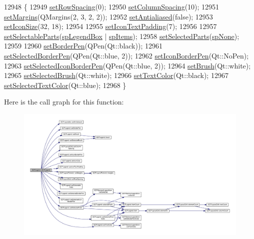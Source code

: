 \begin{DoxyCode}
12948 \{
12949   \hyperlink{class_q_c_p_layout_grid_aaef2cd2d456197ee06a208793678e436}{setRowSpacing}(0);
12950   \hyperlink{class_q_c_p_layout_grid_a3a49272aba32bb0fddc3bb2a45a3dba0}{setColumnSpacing}(10);
12951   \hyperlink{class_q_c_p_layout_element_a8f450b1f3f992ad576fce2c63d8b79cf}{setMargins}(QMargins(2, 3, 2, 2));
12952   \hyperlink{class_q_c_p_layerable_a4fd43e89be4a553ead41652565ff0581}{setAntialiased}(\textcolor{keyword}{false});
12953   \hyperlink{class_q_c_p_legend_a8b0740cce488bf7010da6beda6898984}{setIconSize}(32, 18);
12954   
12955   \hyperlink{class_q_c_p_legend_a62973bd69d5155e8ea3141366e8968f6}{setIconTextPadding}(7);
12956   
12957   \hyperlink{class_q_c_p_legend_a9ce60aa8bbd89f62ae4fa83ac6c60110}{setSelectableParts}(\hyperlink{class_q_c_p_legend_a5404de8bc1e4a994ca4ae69e2c7072f1a0fa4758962a46fa1dc9da818abae23c4}{spLegendBox} | \hyperlink{class_q_c_p_legend_a5404de8bc1e4a994ca4ae69e2c7072f1a768bfb95f323db4c66473375032c0af7}{spItems});
12958   \hyperlink{class_q_c_p_legend_a2aee309bb5c2a794b1987f3fc97f8ad8}{setSelectedParts}(\hyperlink{class_q_c_p_legend_a5404de8bc1e4a994ca4ae69e2c7072f1a378201c07d500af7126e3ec91652eed7}{spNone});
12959   
12960   \hyperlink{class_q_c_p_legend_a866a9e3f5267de7430a6c7f26a61db9f}{setBorderPen}(QPen(Qt::black));
12961   \hyperlink{class_q_c_p_legend_a2c35d262953a25d96b6112653fbefc88}{setSelectedBorderPen}(QPen(Qt::blue, 2));
12962   \hyperlink{class_q_c_p_legend_a2f2c93d18a651f4ff294bb3f026f49b8}{setIconBorderPen}(Qt::NoPen);
12963   \hyperlink{class_q_c_p_legend_ade93aabe9bcccaf9cf46cec22c658027}{setSelectedIconBorderPen}(QPen(Qt::blue, 2));
12964   \hyperlink{class_q_c_p_legend_a497bbcd38baa3598c08e2b3f48103f23}{setBrush}(Qt::white);
12965   \hyperlink{class_q_c_p_legend_a875227f3219c9799464631dec5e8f1bd}{setSelectedBrush}(Qt::white);
12966   \hyperlink{class_q_c_p_legend_ae1eb239ff4a4632fe1b6c3e668d845c6}{setTextColor}(Qt::black);
12967   \hyperlink{class_q_c_p_legend_a7674dfc7a1f30e1abd1018c0ed45e0bc}{setSelectedTextColor}(Qt::blue);
12968 \}
\end{DoxyCode}


Here is the call graph for this function\+:\nopagebreak
\begin{figure}[H]
\begin{center}
\leavevmode
\includegraphics[width=350pt]{class_q_c_p_legend_a0001a456989bd07ea378883651fabd72_cgraph}
\end{center}
\end{figure}


